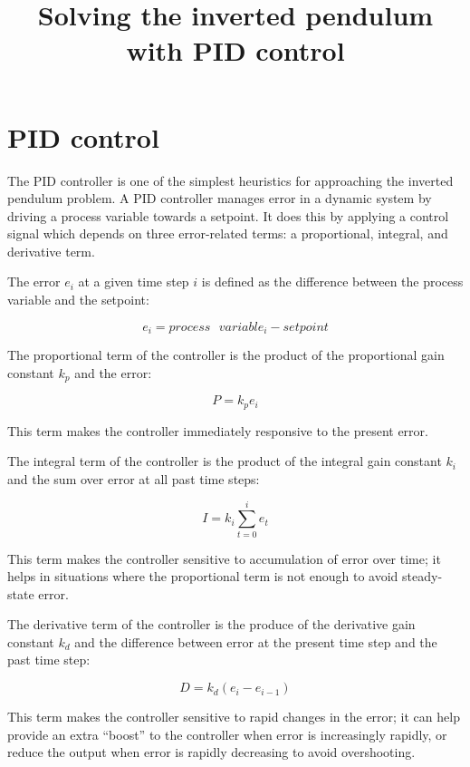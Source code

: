 \documentclass[12pt]{article}
\title{Solving the inverted pendulum with PID control}
\date{}
\begin{document}
\maketitle

\section{PID control}

The PID controller is one of the simplest heuristics for approaching the inverted pendulum problem. A PID controller manages error in a dynamic system by driving a process variable towards a setpoint. It does this by applying a control signal which depends on three error-related terms: a proportional, integral, and derivative term.

The error $e_i$ at a given time step $i$ is defined as the difference between the process variable and the setpoint:

\begin{equation}
e_i = process\mbox{ }variable_i - setpoint
\end{equation}

The proportional term of the controller is the product of the proportional gain constant $k_p$ and the error:

\begin{equation}
P = k_p e_i
\end{equation}

This term makes the controller immediately responsive to the present error.

The integral term of the controller is the product of the integral gain constant $k_i$ and the sum over error at all past time steps:

\begin{equation}
I = k_i \sum_{t = 0}^{i} e_t
\end{equation}

This term makes the controller sensitive to accumulation of error over time; it helps in situations where the proportional term is not enough to avoid steady-state error.

The derivative term of the controller is the produce of the derivative gain constant $k_d$ and the difference between error at the present time step and the past time step:

\begin{equation}
D = k_d (e_i - e_{i-1})
\end{equation}

This term makes the controller sensitive to rapid changes in the error; it can help provide an extra ``boost'' to the controller when error is increasingly rapidly, or reduce the output when error is rapidly decreasing to avoid overshooting.
\end{document}
